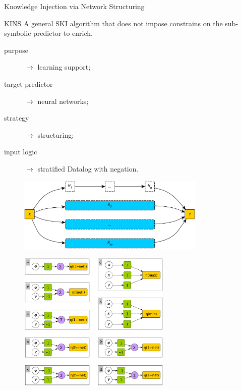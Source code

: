 \documentclass[presentation]{beamer}\mode<presentation>{\usetheme{AMSBolognaFC}}
\begin{document}
\begin{frame}[allowframebreaks]{Knowledge Injection via Network Structuring}
    
    \begin{block}{KINS}
        A general SKI algorithm that does not impose constrains on the sub-symbolic predictor to enrich.
        \begin{description}
            \item[purpose] $\rightarrow$ learning support;
            \item[target predictor] $\rightarrow$ neural networks;
            \item[strategy] $\rightarrow$ structuring;
            \item[input logic] $\rightarrow$ stratified Datalog with negation.
        \end{description}        
    \end{block}

    \framebreak
    
    \begin{figure}
        \centering
        \includegraphics[width=0.8\textwidth]{figures/kins-architecture}
    \end{figure}

    \framebreak
    
    
    
    \framebreak
    
    \begin{figure}
        \centering
        \includegraphics[width=0.65\textwidth]{figures/kins-fuzzifier-modules}
    \end{figure}
    
\end{frame}
\end{document}
